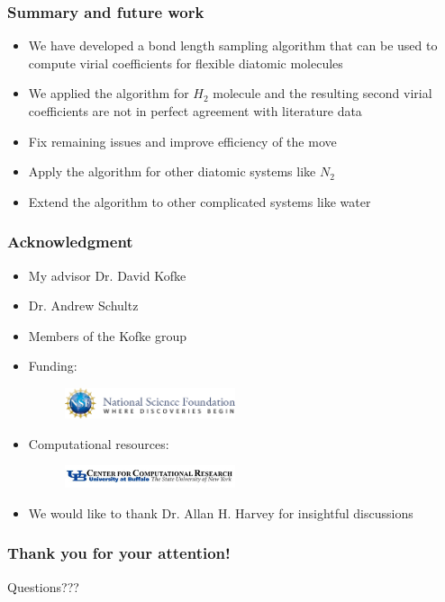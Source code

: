 \documentclass[xcolor=svgnames]{beamer}
\begin{document}
	\begin{frame}
	\frametitle{Summary and future work}
	\begin{itemize}
	\justifying
	\item We have developed a bond length sampling algorithm that can be used to compute virial coefficients for flexible diatomic molecules
	\item We applied the algorithm for $H_2$ molecule and the resulting second virial coefficients are not in perfect agreement with literature data      
	\item Fix remaining issues and improve efficiency of the move
	\item Apply the algorithm for other diatomic systems like $N_2$
	\item Extend the algorithm to other complicated systems like water
	\end{itemize}
	\end{frame}
	
	\begin{frame}
	\setbeamertemplate{headline}{}
	\frametitle{Acknowledgment}
	\begin{itemize}
	\item My advisor Dr. David Kofke
	\item Dr. Andrew Schultz
	\item Members of the Kofke group
	\item Funding:
	\begin{figure}
	\centering
	\includegraphics[width=5cm,keepaspectratio]{nsfLogo.png}
	\end{figure}
	\item Computational resources:
	\begin{figure}
	\includegraphics[width=5cm,keepaspectratio]{ccrLogo.jpg}
	\end{figure}
	\item We would like to thank Dr. Allan H. Harvey for insightful discussions
	\end {itemize}
	\end{frame}

	\begin{frame}
	\frametitle{Thank you for your attention!}
	\begin{center}
	\huge{Questions???}
	\end{center}
	\end{frame}
\end{document}
